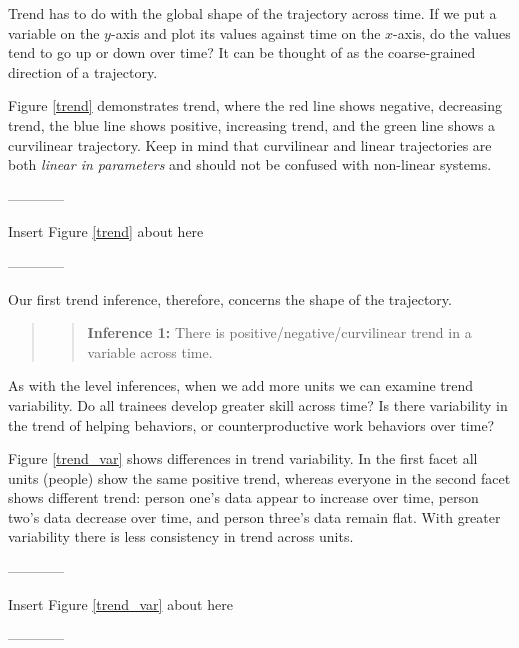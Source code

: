\documentclass[english,,man]{apa6}
\theoremstyle{definition}
\theoremstyle{definition}
\theoremstyle{definition}
\theoremstyle{remark}
\begin{document}
Trend has to do with the global shape of the trajectory across time. If
we put a variable on the \(y\)-axis and plot its values against time on
the \(x\)-axis, do the values tend to go up or down over time? It can be
thought of as the coarse-grained direction of a trajectory.

Figure \ref{trend} demonstrates trend, where the red line shows
negative, decreasing trend, the blue line shows positive, increasing
trend, and the green line shows a curvilinear trajectory. Keep in mind
that curvilinear and linear trajectories are both \emph{linear in
parameters} and should not be confused with non-linear systems.

\begin{center}

------------

Insert Figure \ref{trend} about here

------------

\end{center}

Our first trend inference, therefore, concerns the shape of the
trajectory.

\begin{quote}
\begin{quote}
\textbf{Inference 1:} There is positive/negative/curvilinear trend in a
variable across time.
\end{quote}
\end{quote}

As with the level inferences, when we add more units we can examine
trend variability. Do all trainees develop greater skill across time? Is
there variability in the trend of helping behaviors, or
counterproductive work behaviors over time?

Figure \ref{trend_var} shows differences in trend variability. In the
first facet all units (people) show the same positive trend, whereas
everyone in the second facet shows different trend: person one's data
appear to increase over time, person two's data decrease over time, and
person three's data remain flat. With greater variability there is less
consistency in trend across units.

\begin{center}

------------

Insert Figure \ref{trend_var} about here

------------

\end{center}
\end{document}
